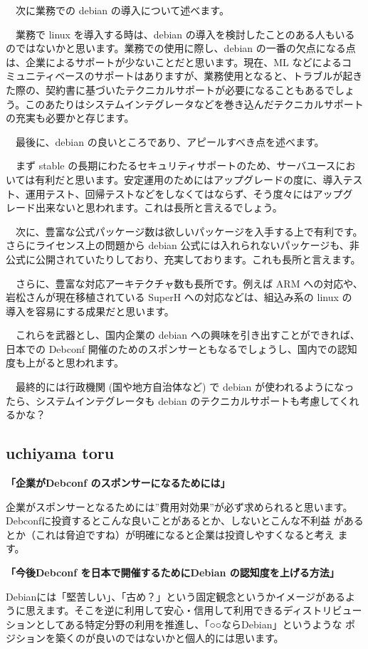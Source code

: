 \documentclass[mingoth,a4paper]{jsarticle}
\begin{document}
　次に業務での debian の導入について述べます。

　業務で linux を導入する時は、debian の導入を検討したことのある人もいる
のではないかと思います。業務での使用に際し、debian の一番の欠点になる点
は、企業によるサポートが少ないことだと思います。現在、ML などによるコ
ミュニティベースのサポートはありますが、業務使用となると、トラブルが起き
た際の、契約書に基づいたテクニカルサポートが必要になることもあるでしょ
う。このあたりはシステムインテグレータなどを巻き込んだテクニカルサポート
の充実も必要かと存じます。

　最後に、debian の良いところであり、アピールすべき点を述べます。

　まず stable の長期にわたるセキュリティサポートのため、サーバユースにお
いては有利だと思います。安定運用のためにはアップグレードの度に、導入テス
ト、運用テスト、回帰テストなどをしなくてはならず、そう度々にはアップグ
レード出来ないと思われます。これは長所と言えるでしょう。

　次に、豊富な公式パッケージ数は欲しいパッケージを入手する上で有利です。
さらにライセンス上の問題から debian 公式には入れられないパッケージも、非
公式に公開されていたりしており、充実しております。これも長所と言えます。

　さらに、豊富な対応アーキテクチャ数も長所です。例えば ARM への対応や、
岩松さんが現在移植されている SuperH への対応などは、組込み系の linux の
導入を容易にする成果だと思います。

　これらを武器とし、国内企業の debian への興味を引き出すことができれば、
日本での Debconf 開催のためのスポンサーともなるでしょうし、国内での認知
度も上がると思われます。

　最終的には行政機関 (国や地方自治体など) で debian が使われるようになっ
たら、システムインテグレータも debian のテクニカルサポートも考慮してくれ
るかな？


\subsection{uchiyama toru}


\textbf{「企業がDebconf のスポンサーになるためには」}

企業がスポンサーとなるためには”費用対効果”が必ず求められると思います。
Debconfに投資するとこんな良いことがあるとか、しないとこんな不利益
があるとか（これは脅迫ですね）が明確になると企業は投資しやすくなると考え
ます。

\textbf{「今後Debconf を日本で開催するためにDebian の認知度を上げる方法」}

Debianには「堅苦しい」、「古め？」という固定観念というかイメージがあるよ
うに思えます。そこを逆に利用して安心・信用して利用できるディストリビュー
ションとしてある特定分野の利用を推進し、「○○ならDebian」というような
ポジションを築くのが良いのではないかと個人的には思います。
\end{document}
